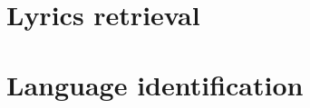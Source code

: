 \cite{fujihara} \cite{goto_alignment} \\
\medskip
\cite{WongSW07} \\ %
\medskip
\cite{LeeC08} \\ %
\medskip
\cite{mauch_alignment2010} \cite{mauch_alignment2} \\
\medskip
\cite{mesaros_alignment} \\ %
\medskip
\cite{gong_alignment} \\
\medskip
\cite{dzhambazov_alignment}



\section{Lyrics retrieval}



\section{Language identification}
